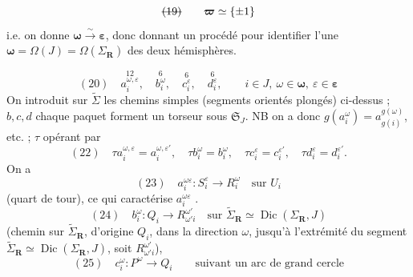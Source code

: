 \documentclass[11pt,a4paper]{article}
\begin{document}
\[
  \text{\struck{(19)}}\qquad
  \boldsymbol{\varpi} \simeq \{\pm 1\}
\]
 i.e. on donne $\boldsymbol{\omega} \xrightarrow{\sim} \boldsymbol{\varepsilon}$,
donc donnant un procédé pour identifier l'une $\boldsymbol{\omega} = \Omega(J) = \Omega(\Sigma_{\mathbf{R}})$
 \ill{} des deux hémisphères.

\[
  (20)\quad
  \overset{12}{a_i^{\omega,\varepsilon}},\quad
  \overset{6}{b_i^{\omega}},\quad
  \overset{6}{c_i^{\varepsilon}},\quad
  \overset{6}{d_i^{\varepsilon}},
  \qquad i \in J,\ \omega \in \boldsymbol{\omega},\ \varepsilon \in \boldsymbol{\varepsilon}
\]
On introduit sur $\widetilde{\Sigma}$ les \struck{\ill{}} chemins simples (segments orientés
plongés) ci-dessus ; $b, c, d$ chaque paquet forment un torseur sous $\mathfrak{S}_J$.
NB on a donc $g(a_i^{\omega}) = a_{g(i)}^{g(\omega)}$, etc. ; $\tau$ opérant par
\[
  (22)\quad
  \tau a_i^{\omega,\varepsilon} = a_i^{\omega,\varepsilon'}, \quad
  \tau b_i^{\omega} = b_i^{\omega}, \quad
  \tau c_i^{\varepsilon} = c_i^{\varepsilon'}, \quad
  \tau d_i^{\varepsilon} = d_i^{\varepsilon'} .
\]
On a
\[
  (23)\quad a_i^{\omega\varepsilon} : S_i^{\varepsilon} \longrightarrow R_i^{\omega}
  \quad \text{sur } U_i
\]
 (quart de tour), ce qui
caractérise $a_i^{\omega\varepsilon}$ .
\[
  (24)\quad b_i^{\omega} : Q_i \longrightarrow R_{\omega' i}^{\omega'}
  \quad \text{sur } \widetilde{\Sigma}_{\mathbf{R}} \simeq \operatorname{Dic}(\Sigma_{\mathbf{R}}, J)
\]
 (chemin sur $\widetilde{\Sigma}_{\mathbf{R}}$, d'origine
$Q_i$, dans la direction $\omega$, jusqu'à l'extrémité \struck{\ill{}} du segment
$\widetilde{\Sigma}_{\mathbf{R}} \simeq \operatorname{Dic}(\Sigma_{\mathbf{R}}, J)$, soit
$R_{\omega' i}^{\omega'}$),
\[
  (25)\quad c_i^{\omega} : P^{\omega} \longrightarrow Q_i
  \qquad \text{suivant un arc de grand cercle}
\]
\end{document}
